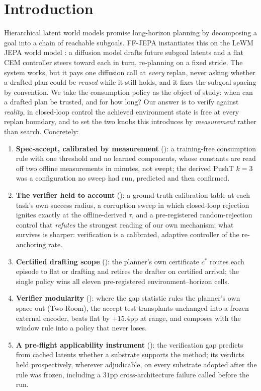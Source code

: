 \documentclass{article}
\begin{document}
\section{Introduction}
\label{sec:intro}
Hierarchical latent world models promise long-horizon planning by decomposing a goal
into a chain of reachable subgoals. FF-JEPA \citep{ffjepa} instantiates this on the
LeWM JEPA world model \citep{lewm}: a diffusion model drafts future subgoal latents
and a flat CEM controller \citep{cem} steers toward each in turn, re-planning on a
fixed stride. The system works, but it pays one diffusion call at \emph{every}
replan, never asking whether a drafted plan could be \emph{reused} while it
still holds, and it fixes the subgoal spacing by convention. We take the
consumption policy as the object of study: when can a drafted plan be trusted,
and for how long? Our answer is to verify against \emph{reality}, in
closed-loop control the achieved environment state is free at every replan
boundary, and to set the two knobs this introduces by \emph{measurement}
rather than search. Concretely:

\begin{enumerate}[itemsep=2pt,topsep=2pt]
\item \textbf{Spec-accept, calibrated by measurement}
(): a training-free consumption rule with one
threshold and no learned components, whose constants are read off two offline
measurements in minutes, not swept; the derived PushT $k{=}3$ was a
configuration no sweep had run, predicted and then confirmed.
\item \textbf{The verifier held to account} (): a
ground-truth calibration table at each task's own success radius, a corruption
sweep in which closed-loop rejection ignites exactly at the offline-derived
$\tau$, and a pre-registered random-rejection control that \emph{refutes} the
strongest reading of our own mechanism; what survives is sharper: verification
is a calibrated, adaptive controller of the re-anchoring rate.
\item \textbf{Certified drafting scope}
(): the planner's own certificate
$c^{*}$ routes each episode to flat or drafting and retires the drafter on
certified arrival; the single policy wins all eleven pre-registered
environment--horizon cells.
\item \textbf{Verifier modularity} (): where the gap
statistic rules the planner's own space out (Two-Room), the accept test
transplants unchanged into a frozen external encoder, beats flat by $+15.4$pp
at range, and composes with the window rule into a policy that never loses.
\item \textbf{A pre-flight applicability instrument}
(): the verification gap predicts from
cached latents whether a substrate supports the method; its verdicts held
prospectively, wherever adjudicable, on every substrate adopted after the rule
was frozen, including a $31$pp cross-architecture failure called before the
run.
\end{enumerate}
\end{document}
